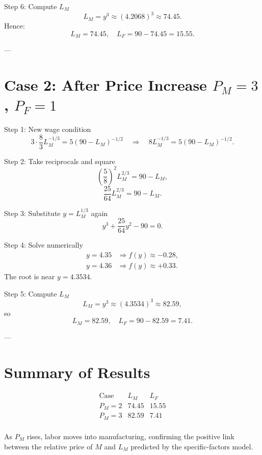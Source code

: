 \documentclass[12pt]{article}
\begin{document}
\bigskip
\noindent Step 6: Compute $L_M$
\[
L_M = y^3 \approx (4.2068)^3 \approx 74.45.
\]
Hence:
\[
\boxed{L_M = 74.45, \quad L_F = 90 - 74.45 = 15.55.}
\]

---

\section*{Case 2: After Price Increase $P_M=3$, $P_F=1$}

\noindent Step 1: New wage condition
\[
3 \cdot \frac{8}{3}L_M^{-1/3} = 5(90 - L_M)^{-1/2} \quad \Rightarrow \quad 8L_M^{-1/3} = 5(90 - L_M)^{-1/2}.
\]

\bigskip
\noindent Step 2: Take reciprocals and square
\[
\left(\frac{5}{8}\right)^2 L_M^{2/3} = 90 - L_M,
\]
\[
\frac{25}{64}L_M^{2/3} = 90 - L_M.
\]

\bigskip
\noindent Step 3: Substitute $y = L_M^{1/3}$ again
\[
y^3 + \frac{25}{64}y^2 - 90 = 0.
\]

\bigskip
\noindent Step 4: Solve numerically  
\[
\begin{aligned}
y=4.35 &\Rightarrow f(y) \approx -0.28,\\
y=4.36 &\Rightarrow f(y) \approx +0.33.
\end{aligned}
\]
The root is near $y = 4.3534$.

\bigskip
\noindent Step 5: Compute $L_M$
\[
L_M = y^3 \approx (4.3534)^3 \approx 82.59,
\]
so
\[
\boxed{L_M = 82.59, \quad L_F = 90 - 82.59 = 7.41.}
\]

---

\section*{Summary of Results}
\[
\begin{array}{lcc}
\text{Case} & L_M & L_F \\
\hline
P_M = 2 & 74.45 & 15.55 \\
P_M = 3 & 82.59 & 7.41 \\
\end{array}
\]

\noindent As $P_M$ rises, labor moves into manufacturing, confirming the positive link between the relative price of $M$ and $L_M$ predicted by the specific-factors model.
\end{document}

